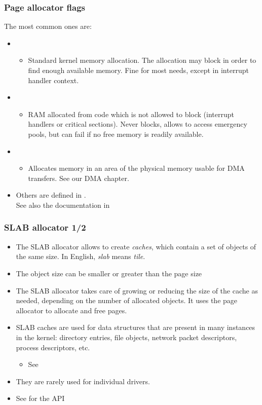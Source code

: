 \begin{frame}
  \frametitle{Page allocator flags}
  The most common ones are:
  \begin{itemize}
  \item {}
    \begin{itemize}
    \item Standard kernel memory allocation. The allocation may
      block in order to find enough available memory. Fine for most
      needs, except in interrupt handler context.
    \end{itemize}
  \item {}
    \begin{itemize}
    \item RAM allocated from code which is not allowed to block
      (interrupt handlers or critical sections). Never blocks,
      allows to access emergency pools, but can fail if no free
      memory is readily available.
    \end{itemize}
  \item {}
    \begin{itemize}
    \item Allocates memory in an area of the physical memory usable
      for DMA transfers. See our DMA chapter.
    \end{itemize}
  \item Others are defined in .\\
      See also the documentation in 
  \end{itemize}
\end{frame}

\begin{frame}
  \frametitle{SLAB allocator 1/2}
  \begin{itemize}
  \item The SLAB allocator allows to create {\em caches}, which contain a
    set of objects of the same size. In English, {\em slab} means {\em tile}.
  \item The object size can be smaller or greater than the page size
  \item The SLAB allocator takes care of growing or reducing the size
    of the cache as needed, depending on the number of allocated
    objects. It uses the page allocator to allocate and free pages.
  \item SLAB caches are used for data structures that are present in
    many instances in the kernel: directory entries, file
    objects, network packet descriptors, process descriptors, etc.
    \begin{itemize}
    \item See 
    \end{itemize}
  \item They are rarely used for individual drivers.
  \item See  for the API
\end{itemize}
\end{frame}

